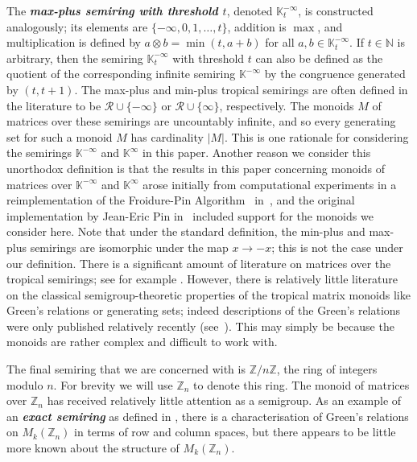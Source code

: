\documentclass[11pt]{article}
\newcommand{\defn}[1]{\textbf{\textit{#1}}}
\numberwithin{equation}{section}
\renewcommand{\to}{\longrightarrow}
\newcommand{\R}{\mathscr{R}}
\newcommand{\N}{\mathbb{N}}
\newcommand{\Z}{\mathbb{Z}}
\newcommand{\K}{\mathbb{K}}
\newcommand{\Kmin}{\K^{\infty}}
\newcommand{\Kmax}{\K^{-\infty}}
\newcommand{\Kmaxt}{\K^{-\infty}_t}
\begin{document}
The \defn{max-plus semiring with threshold $t$}, denoted $\Kmaxt$, is
constructed analogously; its elements are $\{-\infty, 0, 1, \ldots, t\}$,
addition is $\max$, and multiplication is defined by $a \otimes b = \min(t, a +
b)$ for all $a, b \in \Kmaxt$.
If $t\in \N$ is arbitrary, then the semiring $\Kmaxt$ with threshold $t$ can
also be defined as the quotient of the corresponding infinite semiring $\Kmax$
by the congruence generated by $(t, t + 1)$. The max-plus and min-plus tropical
semirings are often defined in the literature to be $\R\cup\{-\infty\}$ or
$\R\cup\{\infty\}$, respectively. The monoids $M$ of matrices over these
semirings are uncountably infinite, and so every generating set for such a
monoid $M$ has cardinality $|M|$. This is one rationale for considering the
semirings $\Kmax$ and $\Kmin$ in this paper. Another reason we consider this
unorthodox definition is that the results in this paper concerning monoids of
matrices over $\Kmax$ and $\Kmin$ arose initially from computational experiments
in a reimplementation of the Froidure-Pin Algorithm~\cite{Froidure1997aa,
  Semigroupe} in~\cite{Libsemigroups}, and the original implementation by
Jean-Eric Pin in~\cite{Semigroupe} included support for the monoids
we consider here. 
Note that under the standard
definition, the min-plus and max-plus semirings are isomorphic under the map $x
\to -x$; this is not the case under our definition. There is a significant
amount of literature on matrices over the tropical semirings; see for example
\cite{Daviaud2018aa, Hollings2012aa, Izhakian2010aa, Johnson2013aa, Johnson2014aa,
  Johnson2019aa, Shitov2014aa, Simon1994aa}. However,
there is relatively little literature on the classical semigroup-theoretic
properties of the tropical matrix monoids like Green's relations or generating
sets; indeed descriptions of the Green's relations were only published
relatively recently (see~\cite{Hollings2012aa, Johnson2013aa}). This may simply
be because the monoids are rather complex and difficult to work with.  

The final semiring that we are concerned with is $\Z / n\Z$, the ring of
integers modulo $n$. For brevity we will use $\Z_n$ to denote this ring.
The monoid of matrices over $\Z_n$ has received relatively little attention as a
semigroup. As an example of an \defn{exact semiring} as defined in
\cite{Wilding2013aa}, there is a characterisation of Green's relations on
$M_k(\Z_n)$ in terms of row and column spaces, but there appears to be little
more known about the structure of $M_k(\Z_n)$.
\end{document}
